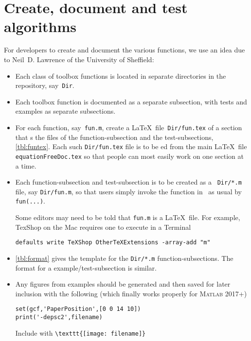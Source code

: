 \section{Create, document and test algorithms}
\label{sec:contribute}
\secttoc

For developers to create and document the various functions, we use an idea due to Neil~D. Lawrence of the University of Sheffield:

\begin{itemize}
\item Each class of toolbox functions is located in separate directories in the repository, say~\verb|Dir|.

\item Each toolbox function is documented as a separate subsection, with tests and examples as separate subsections.

\item For each function, say~\verb|fun.m|, create a \LaTeX\ file~\verb|Dir/fun.tex| of a section that \verb||s the  files of the function-subsection and the test-subsections, \autoref{tbl:funtex}.
Each such \verb|Dir/fun.tex| file is to be \verb||ed from the main \LaTeX\ file \verb|equationFreeDoc.tex| so that people can most easily work on one section at a time.  

\item Each function-subsection and test-subsection is to be created as a \script\ \verb|Dir/*.m| file, say \verb|Dir/fun.m|, so that users simply invoke the function in \script\ as usual by \verb|fun(...)|.

Some editors may need to be told that \verb|fun.m| is a \LaTeX\ file.  For example, TexShop on the Mac requires one to execute in a Terminal
\begin{verbatim}
defaults write TeXShop OtherTeXExtensions -array-add "m"
\end{verbatim}

\item \autoref{tbl:format} gives the template for the \verb|Dir/*.m| function-subsections.
The format for a example\slash test-subsection is similar.


\item Any figures from examples should be generated and then saved for later inclusion with the following (which finally works properly for \textsc{Matlab} 2017+)
\begin{verbatim}
set(gcf,'PaperPosition',[0 0 14 10])
print('-depsc2',filename)
\end{verbatim}
Include with \quad \verb|\texttt{[image: filename]}|

\end{itemize}


